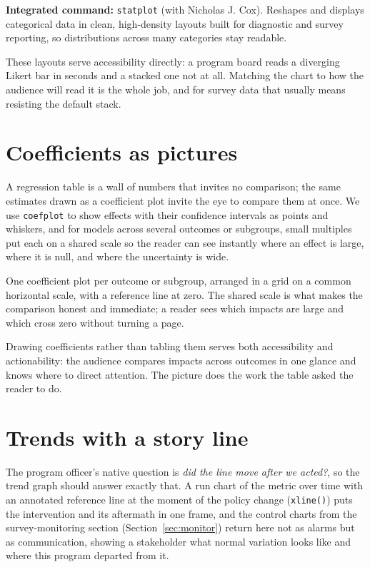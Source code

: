 \documentclass[
    a4paper,
    fontsize=10pt,
    twoside=true,
    numbers=noenddot,
]{kaobook}
\newenvironment{vizcallout}[1][Visualization to build]{%
    \begin{vizbox}[frametitle={#1}]%
}{%
    \end{vizbox}%
}
\begin{document}
\begin{kaobox}[frametitle=Package Integration: \texttt{statplot}]
\textbf{Integrated command:} \texttt{statplot} (with Nicholas J. Cox). Reshapes and displays categorical data in clean, high-density layouts built for diagnostic and survey reporting, so distributions across many categories stay readable.
\end{kaobox}

These layouts serve accessibility directly: a program board reads a diverging Likert bar in seconds and a stacked one not at all. Matching the chart to how the audience will read it is the whole job, and for survey data that usually means resisting the default stack.

\section{Coefficients as pictures}
A regression table is a wall of numbers that invites no comparison; the same estimates drawn as a coefficient plot invite the eye to compare them at once. We use \texttt{coefplot} to show effects with their confidence intervals as points and whiskers, and for models across several outcomes or subgroups, small multiples put each on a shared scale so the reader can see instantly where an effect is large, where it is null, and where the uncertainty is wide.

\begin{vizcallout}[Visualization to build: the small-multiple coefficient plot]
One coefficient plot per outcome or subgroup, arranged in a grid on a common horizontal scale, with a reference line at zero. The shared scale is what makes the comparison honest and immediate; a reader sees which impacts are large and which cross zero without turning a page.
\end{vizcallout}

Drawing coefficients rather than tabling them serves both accessibility and actionability: the audience compares impacts across outcomes in one glance and knows where to direct attention. The picture does the work the table asked the reader to do.

\section{Trends with a story line}
The program officer's native question is \emph{did the line move after we acted?}, so the trend graph should answer exactly that. A run chart of the metric over time with an annotated reference line at the moment of the policy change (\texttt{xline()}) puts the intervention and its aftermath in one frame, and the control charts from the survey-monitoring section (Section~\ref{sec:monitor}) return here not as alarms but as communication, showing a stakeholder what normal variation looks like and where this program departed from it.
\end{document}
